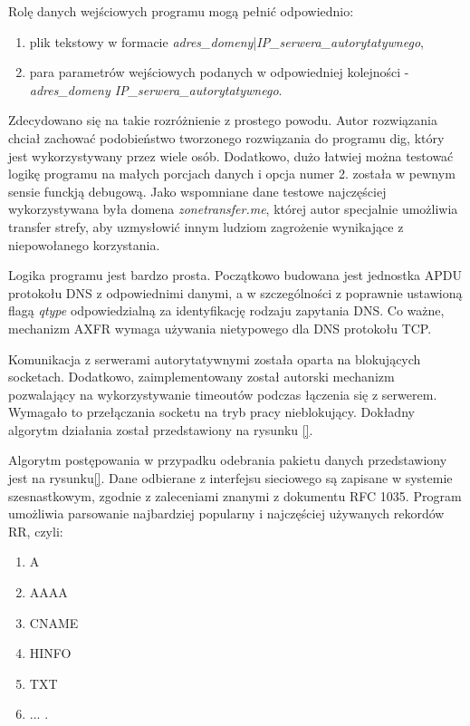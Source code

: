 Rolę danych wejściowych programu mogą pełnić odpowiednio:
\begin{enumerate}
	\item plik tekstowy w formacie \textit{adres\_domeny}|\textit{IP\_serwera\_autorytatywnego},
	\item para parametrów wejściowych podanych w odpowiedniej kolejności - \textit{adres\_domeny IP\_serwera\_autorytatywnego}. 
\end{enumerate}
Zdecydowano się na takie rozróżnienie z prostego powodu. Autor rozwiązania chciał zachować podobieństwo tworzonego rozwiązania do programu dig, który jest wykorzystywany przez wiele osób. Dodatkowo, dużo łatwiej można testować logikę programu na małych porcjach danych i opcja numer 2. została w pewnym sensie funckją debugową. Jako wspomniane dane testowe najczęściej wykorzystywana była domena \textit{zonetransfer.me}\cite{zonetransfer}, której autor specjalnie umożliwia transfer strefy, aby uzmysłowić innym ludziom zagrożenie wynikające z niepowołanego korzystania.

Logika programu jest bardzo prosta. Początkowo budowana jest jednostka APDU protokołu DNS z odpowiednimi danymi, a w szczególności z poprawnie ustawioną flagą \textit{qtype} odpowiedzialną za identyfikację rodzaju zapytania DNS. Co ważne, mechanizm AXFR wymaga używania nietypowego dla DNS protokołu TCP.

Komunikacja z serwerami autorytatywnymi została oparta na blokujących socketach. Dodatkowo, zaimplementowany został autorski mechanizm pozwalający na wykorzystywanie timeoutów podczas łączenia się z serwerem. Wymagało to przełączania socketu na tryb pracy nieblokujący. Dokładny algorytm działania został przedstawiony na rysunku \ref{}.

Algorytm postępowania w przypadku odebrania pakietu danych przedstawiony jest na rysunku\ref{}. Dane odbierane z interfejsu sieciowego są zapisane w systemie szesnastkowym, zgodnie z zaleceniami znanymi z dokumentu RFC 1035\cite{RFC1035}. Program umożliwia parsowanie najbardziej popularny i najczęściej używanych rekordów RR, czyli:
\begin{enumerate}
	\item A
	\item AAAA
	\item CNAME
	\item HINFO
	\item TXT
	\item ... .
\end{enumerate} 


